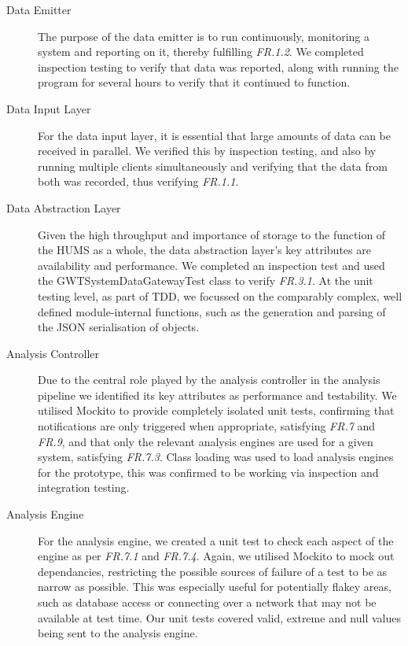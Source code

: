 \documentclass[10pt,a4paper]{article}
\newcommand{\frit}[1]{\textit{FR.#1}}
\begin{document}
\begin{description}

  \item[Data Emitter] The purpose of the data emitter is to run
    continuously, monitoring a system and reporting on it, thereby
    fulfilling \frit{1.2}. We completed inspection testing to verify 
    that data was reported, along with running the program for 
    several hours to verify that it continued to function.

  \item[Data Input Layer] For the data input layer, it is essential that large
    amounts of data can be received in parallel. We verified this by
    inspection testing, and also by running multiple clients simultaneously and
    verifying that the data from both was recorded, thus verifying \frit{1.1}.

  \item[Data Abstraction Layer] Given the high throughput and
    importance of storage to the function of the HUMS as a whole, the
    data abstraction layer's key attributes are availability and
    performance. We completed an inspection test and used the 
    GWTSystemDataGatewayTest class to verify \frit{3.1}. At the unit 
    testing level, as  part of TDD, we focussed on the comparably complex,
    well defined module-internal functions, such as the generation and 
    parsing of the JSON serialisation of objects.
    
  \item[Analysis Controller] Due to the central role played by the 
  analysis controller in the analysis pipeline we identified its key 
  attributes as performance and testability. We utilised Mockito to 
  provide completely isolated unit tests, confirming that notifications 
  are only triggered when appropriate, satisfying \frit{7} and \frit{9}, and 
  that only the relevant analysis engines are used for a given system, 
  satisfying \frit{7.3}. Class loading was used to load analysis engines for 
  the prototype, this was confirmed to be working via inspection and 
  integration testing.
  
  \item[Analysis Engine]
   For the analysis engine, we created a unit test to check each aspect of the 
   engine as per \frit{7.1} and \frit{7.4}. Again, we utilised Mockito to mock out
   dependancies, restricting the possible sources of failure of a test to be 
   as narrow as possible. This was especially useful for potentially flakey 
   areas, such as database access or connecting over a network that may 
   not be available at test time. Our unit tests covered valid, extreme and 
   null values being sent to the analysis engine.


\end{description}
\end{document}
